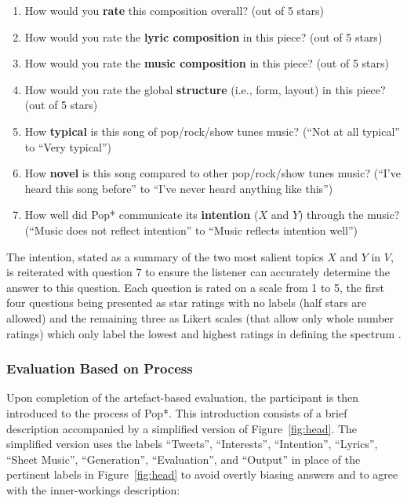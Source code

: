 \documentclass[phd,electronic,oneside,twosidetoc,letterpaper,chaptercenter,parttop,lof,lot]{byumsphd}
\begin{document}
\begin{enumerate}
\item How would you \textbf{rate} this composition overall? (out of 5 stars)
\item How would you rate the \textbf{lyric composition} in this piece? (out of 5 stars)
\item How would you rate the \textbf{music composition} in this piece? (out of 5 stars)
\item How would you rate the global \textbf{structure} (i.e., form, layout) in this piece? (out of 5 stars)
\item How \textbf{typical} is this song of pop/rock/show tunes music? (``Not at all typical'' to ``Very typical'')
\item How \textbf{novel} is this song compared to other pop/rock/show tunes music? (``I've heard this song before'' to ``I've never heard anything like this'')
\item How well did Pop* communicate its \textbf{intention} ($X$ and $Y$) through the music? (``Music does not reflect intention'' to ``Music reflects intention well'')
\end{enumerate}

\noindent The intention, stated as a summary of the two most salient topics $X$ and $Y$ in $V$, is reiterated with question 7 to ensure the listener can accurately determine the answer to this question. Each question is rated on a scale from 1 to 5, the first four questions being presented as star ratings with no labels (half stars are allowed) and the remaining three as Likert scales (that allow only whole number ratings) which only label the lowest and highest ratings in defining the spectrum \citep{likert1932technique}.

\subsubsection{Evaluation Based on Process} Upon completion of the artefact-based evaluation, the participant is then introduced to the process of Pop*. This introduction consists of a brief description accompanied by a simplified version of Figure~\ref{fig:head}. The simplified version uses the labels ``Tweets'', ``Interests'', ``Intention'', ``Lyrics'', ``Sheet Music'', ``Generation'', ``Evaluation'', and ``Output'' in place of the pertinent labels in Figure~\ref{fig:head} to avoid overtly biasing answers and to agree with the inner-workings description:
\end{document}
